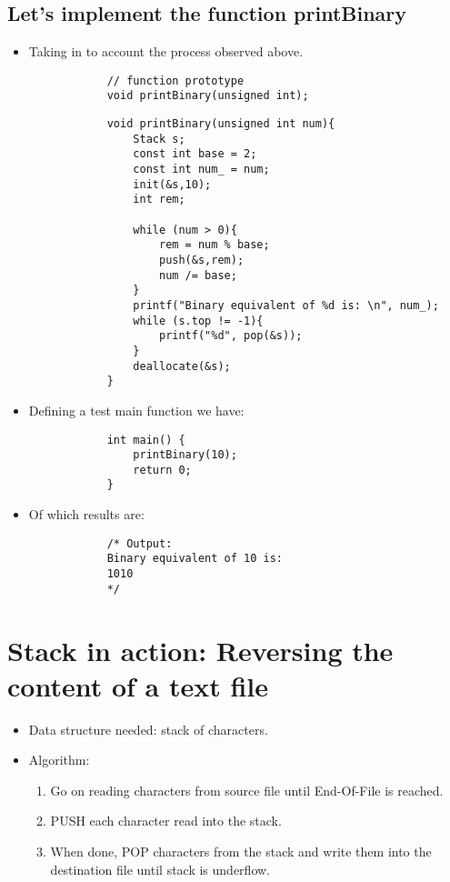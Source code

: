 \subsection{Let's implement the function printBinary}
\begin{itemize}
    \item Taking in to account the process observed above. 
        \begin{verbatim}
            // function prototype
            void printBinary(unsigned int);
        \end{verbatim}
        \begin{verbatim}
            void printBinary(unsigned int num){
                Stack s; 
                const int base = 2; 
                const int num_ = num;
                init(&s,10);
                int rem;

                while (num > 0){
                    rem = num % base; 
                    push(&s,rem);
                    num /= base; 
                }
                printf("Binary equivalent of %d is: \n", num_);
                while (s.top != -1){
                    printf("%d", pop(&s));
                }
                deallocate(&s);
            }
        \end{verbatim}
    
    \item Defining a test main function we have:
        \begin{verbatim}
            int main() {
                printBinary(10);
                return 0;
            }
        \end{verbatim}
    
    \item Of which results are:
        \begin{verbatim}
            /* Output: 
            Binary equivalent of 10 is:
            1010
            */
        \end{verbatim}
\end{itemize}


\section{Stack in action: Reversing the content of a text file}
\begin{itemize}
    \item Data structure needed: stack of characters.
    \item Algorithm:
        \begin{enumerate}
            \item Go on reading characters from source file until End-Of-File is reached.
            \item PUSH each character read into the stack.
            \item When done, POP characters from the stack and write them into the destination file until stack is underflow.
        \end{enumerate}
\end{itemize}



